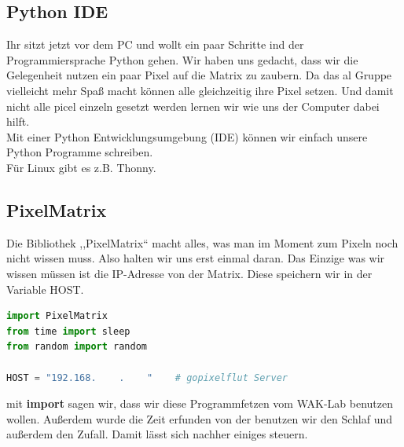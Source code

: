 \subsection{\large{Python IDE}}
Ihr sitzt jetzt vor dem PC und wollt ein paar Schritte ind der Programmiersprache Python gehen. Wir haben uns gedacht, dass wir die Gelegenheit nutzen ein paar Pixel auf die Matrix zu zaubern. Da das al Gruppe vielleicht mehr Spaß macht können alle gleichzeitig ihre Pixel setzen. Und damit nicht alle picel einzeln gesetzt werden lernen wir wie uns der Computer dabei hilft.\\
Mit einer Python Entwicklungsumgebung (IDE) können wir einfach unsere Python Programme schreiben.\\ Für Linux gibt es z.B. Thonny.\\
\subsection{\large{PixelMatrix}}
Die Bibliothek ,,PixelMatrix`` macht alles, was man im Moment zum Pixeln noch nicht wissen muss. Also halten wir uns erst einmal daran. Das Einzige was wir wissen müssen ist die IP-Adresse von der Matrix. Diese speichern wir in der Variable HOST.\\
\begin{lstlisting}[language=Python, caption=Bibliotheken]
import PixelMatrix
from time import sleep
from random import random

HOST = "192.168.    .    "    # gopixelflut Server 
\end{lstlisting}
mit \textbf{import} sagen wir, dass wir diese Programmfetzen vom WAK-Lab benutzen wollen. Außerdem wurde die Zeit erfunden von der benutzen wir den Schlaf und außerdem den Zufall. Damit lässt sich nachher einiges steuern.
